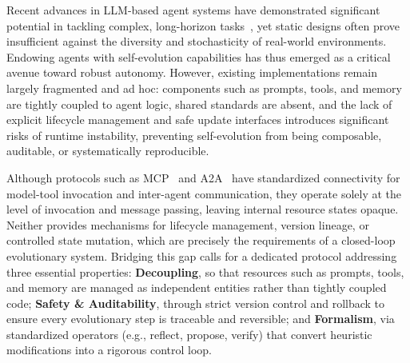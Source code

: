 \documentclass{article}
\theoremstyle{plain}
\theoremstyle{definition}
\theoremstyle{remark}
\begin{document}
Recent advances in LLM-based agent systems have demonstrated significant potential in tackling complex, long-horizon tasks~\cite{yao2022react, wei2022chain, brown2020language}, yet static designs often prove insufficient against the diversity and stochasticity of real-world environments. Endowing agents with self-evolution capabilities has thus emerged as a critical avenue toward robust autonomy. However, existing implementations remain largely fragmented and ad hoc: components such as prompts, tools, and memory are tightly coupled to agent logic, shared standards are absent, and the lack of explicit lifecycle management and safe update interfaces introduces significant risks of runtime instability, preventing self-evolution from being composable, auditable, or systematically reproducible.

Although protocols such as MCP~\cite{anthropic2025agentskills} and A2A~\cite{google2025a2a} have standardized connectivity for model-tool invocation and inter-agent communication, they operate solely at the level of invocation and message passing, leaving internal resource states opaque. Neither provides mechanisms for lifecycle management, version lineage, or controlled state mutation, which are precisely the requirements of a closed-loop evolutionary system. Bridging this gap calls for a dedicated protocol addressing three essential properties: \textbf{Decoupling}, so that resources such as prompts, tools, and memory are managed as independent entities rather than tightly coupled code; \textbf{Safety \& Auditability}, through strict version control and rollback to ensure every evolutionary step is traceable and reversible; and \textbf{Formalism}, via standardized operators (e.g., reflect, propose, verify) that convert heuristic modifications into a rigorous control loop.
\end{document}
